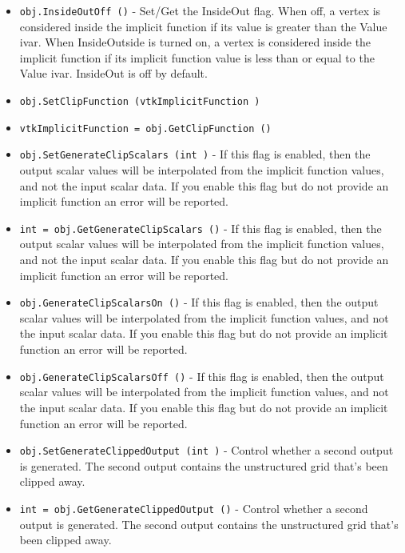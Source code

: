 \begin{itemize}
\item  \verb|obj.InsideOutOff ()| -  Set/Get the InsideOut flag. When off, a vertex is considered inside the
 implicit function if its value is greater than the Value ivar. When
 InsideOutside is turned on, a vertex is considered inside the implicit
 function if its implicit function value is less than or equal to the
 Value ivar.  InsideOut is off by default.

\item  \verb|obj.SetClipFunction (vtkImplicitFunction )|

\item  \verb|vtkImplicitFunction = obj.GetClipFunction ()|

\item  \verb|obj.SetGenerateClipScalars (int )| -  If this flag is enabled, then the output scalar values will be 
 interpolated from the implicit function values, and not the 
 input scalar data. If you enable this flag but do not provide an
 implicit function an error will be reported.

\item  \verb|int = obj.GetGenerateClipScalars ()| -  If this flag is enabled, then the output scalar values will be 
 interpolated from the implicit function values, and not the 
 input scalar data. If you enable this flag but do not provide an
 implicit function an error will be reported.

\item  \verb|obj.GenerateClipScalarsOn ()| -  If this flag is enabled, then the output scalar values will be 
 interpolated from the implicit function values, and not the 
 input scalar data. If you enable this flag but do not provide an
 implicit function an error will be reported.

\item  \verb|obj.GenerateClipScalarsOff ()| -  If this flag is enabled, then the output scalar values will be 
 interpolated from the implicit function values, and not the 
 input scalar data. If you enable this flag but do not provide an
 implicit function an error will be reported.

\item  \verb|obj.SetGenerateClippedOutput (int )| -  Control whether a second output is generated. The second output
 contains the unstructured grid that's been clipped away.

\item  \verb|int = obj.GetGenerateClippedOutput ()| -  Control whether a second output is generated. The second output
 contains the unstructured grid that's been clipped away.


\end{itemize}
